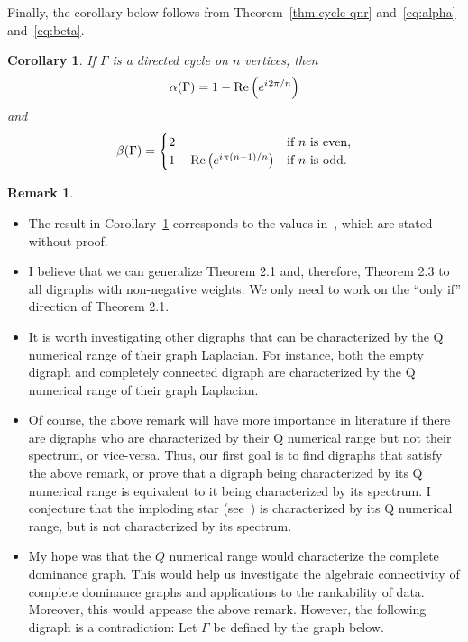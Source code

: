 \documentclass{article}
\newtheorem{corollary}[theorem]{Corollary}
\theoremstyle{definition}
\newtheorem{remark}[theorem]{Remark}
\newcommand{\iu}{{i\mkern1mu}}
\newcommand\re[1]{\operatorname{Re}\left(#1\right)}
\begin{document}
Finally, the corollary below follows from Theorem~\ref{thm:cycle-qnr} and~\eqref{eq:alpha} and~\eqref{eq:beta}.
\begin{corollary}\label{cor:cycle-alpha-beta}
If $\Gamma$ is a directed cycle on $n$ vertices, then
\[
\alpha(\Gamma) = 1-\re{e^{\iu 2\pi/n}}
\]
and
\[
\beta(\Gamma) = \begin{cases} 
				2 & \text{if $n$ is even}, \\
				1 - \re{e^{\iu \pi (n-1)/n}} & \text{if $n$ is odd}.
				\end{cases}
\]
\end{corollary}

\begin{remark}~\\
\begin{itemize}
\item	The result in Corollary~\ref{cor:cycle-alpha-beta} corresponds to the values in~\cite{Wu2005-1}, which are stated without proof.
\item I believe that we can generalize Theorem 2.1 and, therefore, Theorem 2.3 to all digraphs with non-negative weights.
	We only need to work on the ``only if'' direction of Theorem 2.1.
\item	It is worth investigating other digraphs that can be characterized by the Q numerical range of their graph Laplacian.
	For instance, both the empty digraph and completely connected digraph are characterized by the Q numerical range of their graph Laplacian.
\item	Of course, the above remark will have more importance in literature if there are digraphs who are characterized by their Q numerical range but not their spectrum, or vice-versa. 
	Thus, our first goal is to find digraphs that satisfy the above remark, or prove that a digraph being characterized by its Q numerical range is equivalent to it being characterized by its spectrum. 
	I conjecture that the imploding star (see~\cite{Wu2005-1}) is characterized by its Q numerical range, but is not characterized by its spectrum.
\item My hope was that the $Q$ numerical range would characterize the complete dominance graph.
	This would help us investigate the algebraic connectivity of complete dominance graphs and applications to the rankability of data.
	Moreover, this would appease the above remark. 
	However, the following digraph is a contradiction:
	Let $\Gamma$ be defined by the graph below.
	\begin{figure}[h]
	\centering
\end{figure}
\end{itemize}
\end{remark}
\end{document}
